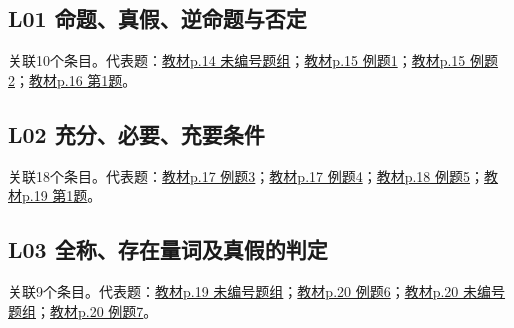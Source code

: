 \par\medskip\noindent\begin{minipage}{\linewidth}\subsection{L01 命题、真假、逆命题与否定}关联10个条目。代表题：\hyperref[XJ-B1-C01-TH-P014-Y1066]{教材p.14 未编号题组}；\hyperref[XJ-B1-C01-EX-P015-Y0177]{教材p.15 例题1}；\hyperref[XJ-B1-C01-EX-P015-Y0738]{教材p.15 例题2}；\hyperref[XJ-B1-C01-PR-P016-Y0217]{教材p.16 第1题}。\end{minipage}\par
\par\medskip\noindent\begin{minipage}{\linewidth}\subsection{L02 充分、必要、充要条件}关联18个条目。代表题：\hyperref[XJ-B1-C01-EX-P017-Y0928]{教材p.17 例题3}；\hyperref[XJ-B1-C01-EX-P017-Y1338]{教材p.17 例题4}；\hyperref[XJ-B1-C01-EX-P018-Y0491]{教材p.18 例题5}；\hyperref[XJ-B1-C01-PR-P019-Y0218]{教材p.19 第1题}。\end{minipage}\par
\par\medskip\noindent\begin{minipage}{\linewidth}\subsection{L03 全称、存在量词及真假的判定}关联9个条目。代表题：\hyperref[XJ-B1-C01-TH-P019-Y1033]{教材p.19 未编号题组}；\hyperref[XJ-B1-C01-EX-P020-Y0562]{教材p.20 例题6}；\hyperref[XJ-B1-C01-TH-P020-Y0942]{教材p.20 未编号题组}；\hyperref[XJ-B1-C01-EX-P020-Y1143]{教材p.20 例题7}。\end{minipage}\par
